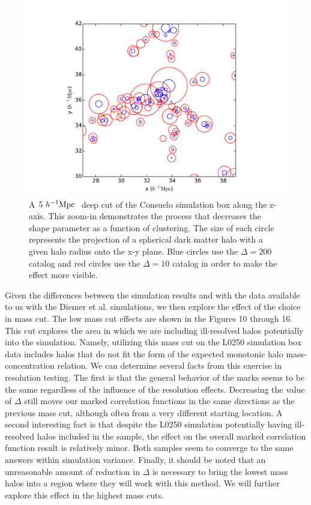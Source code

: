 \documentclass[usenatbib,usegraphicx,letterpaper]{mn2e}
\begin{document}
\begin{figure}
	\centering
	\includegraphics[width=1\textwidth]{plotcircles.pdf}
	\caption{A $5 \ h^{-1}\mathrm{Mpc}~$ deep cut of the Consuelo simulation box along the z-axis. This zoom-in demonstrates the process that decreases the shape parameter as a function of clustering. The size of each circle represents the projection of a spherical dark matter halo with a given halo radius onto the x-y plane. Blue circles use the $\Delta = 200$ catalog and red circles use the $\Delta = 10$ catalog in order to make the effect more visible.}
\end{figure}


Given the differences between the simulation results and with the data available to us with the Diemer et al. simulations, we then explore the effect of the choice in mass cut. The low mass cut effects are shown in the Figures 10 through 16. This cut explores the area in which we are including ill-resolved halos potentially into the simulation. Namely, utilizing this mass cut on the L0250 simulation box data includes halos that do not fit the form of the expected monotonic halo mass-concentration relation. We can determine several facts from this exercise in resolution testing. The first is that the general behavior of the marks seems to be the same regardless of the influence of the resolution effects. Decreasing the value of $\Delta$ still moves our marked correlation functions in the same directions as the previous mass cut, although often from a very different starting location. A second interesting fact is that despite the L0250 simulation potentially having ill-resolved halos included in the sample, the effect on the overall marked correlation function result is relatively minor. Both samples seem to converge to the same answers within simulation variance. Finally, it should be noted that an unreasonable amount of reduction in $\Delta$ is necessary to bring the lowest mass halos into a region where they will work with this method. We will further explore this effect in the highest mass cuts.
\end{document}
